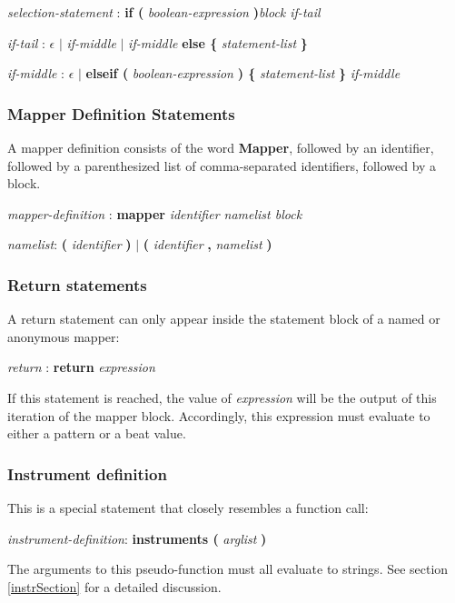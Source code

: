 \emph{selection-statement} : \textbf{if ( } \emph{boolean-expression} \textbf{ )}\emph{block if-tail}

\emph{if-tail} : $\epsilon$ $|$ \emph{if-middle} $|$
\emph{if-middle} \textbf{else \{} \emph{statement-list} \textbf{\}}

\emph{if-middle} : $\epsilon$ $|$ \textbf{elseif ( } \emph{boolean-expression} \textbf{ ) \{} \emph{statement-list} \textbf{\}} \emph{if-middle}

\subsubsection{Mapper Definition Statements}\label{MapperDefinitionStatement}

A mapper definition consists of the word \textbf{Mapper}, followed by an identifier, followed by a parenthesized list of comma-separated identifiers, followed by a block.

\emph{mapper-definition} : \textbf{mapper} \emph{identifier namelist block}

\emph{namelist}: \textbf ( \emph{identifier} \textbf ) $|$  \textbf ( \emph{identifier}
\textbf{,} \emph{namelist} \textbf )

\subsubsection{Return statements}

A return statement can only appear inside the statement block of a named or anonymous mapper:

\emph{return} : \textbf{return} \emph{expression}

If this statement is reached, the value of \emph{expression} will be the output of this iteration of the mapper block.  Accordingly, this expression must evaluate to either a pattern or a beat value.

\subsubsection{Instrument definition}

This is a special statement that closely resembles a function call:

\emph{instrument-definition}: \textbf{instruments (} \emph{arglist} \textbf{)}

The arguments to this pseudo-function must all evaluate to strings.  See section \ref{instrSection} for
a detailed discussion.

